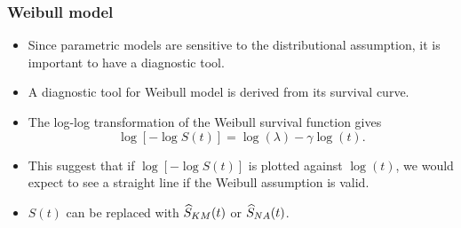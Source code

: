 \documentclass[10pt]{beamer}\usepackage[]{graphicx}\usepackage[]{color}
\newcommand{\Skm}{\widehat{S}_{\scriptsize{KM}}}
\newcommand{\Sna}{\widehat{S}_{\scriptsize{NA}}}
\begin{document}
\begin{frame}
  \frametitle{Weibull model}
  \begin{itemize}
  \item Since parametric models are sensitive to the distributional assumption,
    it is important to have a diagnostic tool.
  \item A diagnostic tool for Weibull model is derived from its survival curve. 
  \item The log-log transformation of the Weibull survival function gives
    $$\log[-\log S(t)] = \log(\lambda) - \gamma\log(t).$$
  \item This suggest that if $\log[-\log S(t)]$ is plotted against $\log(t)$, 
    we would expect to see a straight line if the Weibull assumption is valid. 
  \item $S(t)$ can be replaced with $\Skm(t)$ or $\Sna(t)$.
  \end{itemize}  
\end{frame}
\end{document}
